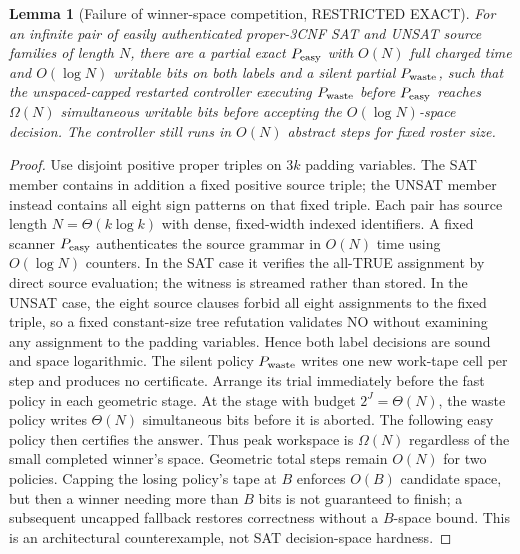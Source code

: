 \documentclass[11pt]{article}
\newtheorem{lemma}{Lemma}
\begin{document}
\begin{lemma}[Failure of winner-space competition, RESTRICTED EXACT]\label{lem:space}
For an infinite pair of easily authenticated proper-3CNF SAT and UNSAT source families of length $N$, there are a partial exact $P_{\rm easy}$ with $O(N)$ full charged time and $O(\log N)$ writable bits on both labels and a silent partial $P_{\rm waste}$, such that the unspaced-capped restarted controller executing $P_{\rm waste}$ before $P_{\rm easy}$ reaches $\Omega(N)$ simultaneous writable bits before accepting the $O(\log N)$-space decision. The controller still runs in $O(N)$ abstract steps for fixed roster size.
\end{lemma}
\begin{proof}
Use disjoint positive proper triples on $3k$ padding variables. The SAT member contains in addition a fixed positive source triple; the UNSAT member instead contains all eight sign patterns on that fixed triple. Each pair has source length $N=\Theta(k\log k)$ with dense, fixed-width indexed identifiers. A fixed scanner $P_{\rm easy}$ authenticates the source grammar in $O(N)$ time using $O(\log N)$ counters. In the SAT case it verifies the all-TRUE assignment by direct source evaluation; the witness is streamed rather than stored. In the UNSAT case, the eight source clauses forbid all eight assignments to the fixed triple, so a fixed constant-size tree refutation validates NO without examining any assignment to the padding variables. Hence both label decisions are sound and space logarithmic. The silent policy $P_{\rm waste}$ writes one new work-tape cell per step and produces no certificate. Arrange its trial immediately before the fast policy in each geometric stage. At the stage with budget $2^J=\Theta(N)$, the waste policy writes $\Theta(N)$ simultaneous bits before it is aborted. The following easy policy then certifies the answer. Thus peak workspace is $\Omega(N)$ regardless of the small completed winner's space. Geometric total steps remain $O(N)$ for two policies. Capping the losing policy's tape at $B$ enforces $O(B)$ candidate space, but then a winner needing more than $B$ bits is not guaranteed to finish; a subsequent uncapped fallback restores correctness without a $B$-space bound. This is an architectural counterexample, not SAT decision-space hardness.
\end{proof}
\end{document}
